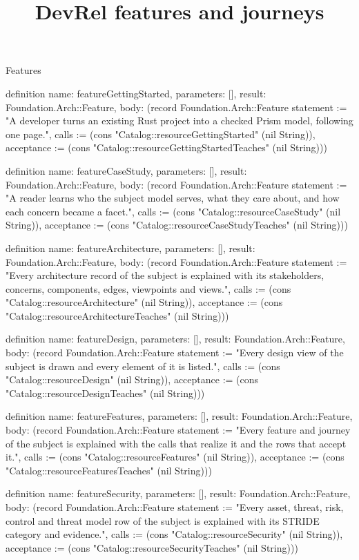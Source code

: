 \begin{lexlean}{Features}
\title{DevRel features and journeys}
\begin{semanticmodule}
definition{
  name: featureGettingStarted,
  parameters: [],
  result: Foundation.Arch::Feature,
  body: (record Foundation.Arch::Feature {statement := "A developer turns an existing Rust project into a checked Prism model, following one page.", calls := (cons "Catalog::resourceGettingStarted" (nil String)), acceptance := (cons "Catalog::resourceGettingStartedTeaches" (nil String))})
}

definition{
  name: featureCaseStudy,
  parameters: [],
  result: Foundation.Arch::Feature,
  body: (record Foundation.Arch::Feature {statement := "A reader learns who the subject model serves, what they care about, and how each concern became a facet.", calls := (cons "Catalog::resourceCaseStudy" (nil String)), acceptance := (cons "Catalog::resourceCaseStudyTeaches" (nil String))})
}

definition{
  name: featureArchitecture,
  parameters: [],
  result: Foundation.Arch::Feature,
  body: (record Foundation.Arch::Feature {statement := "Every architecture record of the subject is explained with its stakeholders, concerns, components, edges, viewpoints and views.", calls := (cons "Catalog::resourceArchitecture" (nil String)), acceptance := (cons "Catalog::resourceArchitectureTeaches" (nil String))})
}

definition{
  name: featureDesign,
  parameters: [],
  result: Foundation.Arch::Feature,
  body: (record Foundation.Arch::Feature {statement := "Every design view of the subject is drawn and every element of it is listed.", calls := (cons "Catalog::resourceDesign" (nil String)), acceptance := (cons "Catalog::resourceDesignTeaches" (nil String))})
}

definition{
  name: featureFeatures,
  parameters: [],
  result: Foundation.Arch::Feature,
  body: (record Foundation.Arch::Feature {statement := "Every feature and journey of the subject is explained with the calls that realize it and the rows that accept it.", calls := (cons "Catalog::resourceFeatures" (nil String)), acceptance := (cons "Catalog::resourceFeaturesTeaches" (nil String))})
}

definition{
  name: featureSecurity,
  parameters: [],
  result: Foundation.Arch::Feature,
  body: (record Foundation.Arch::Feature {statement := "Every asset, threat, risk, control and threat model row of the subject is explained with its STRIDE category and evidence.", calls := (cons "Catalog::resourceSecurity" (nil String)), acceptance := (cons "Catalog::resourceSecurityTeaches" (nil String))})
}


\end{semanticmodule}
\end{lexlean}
